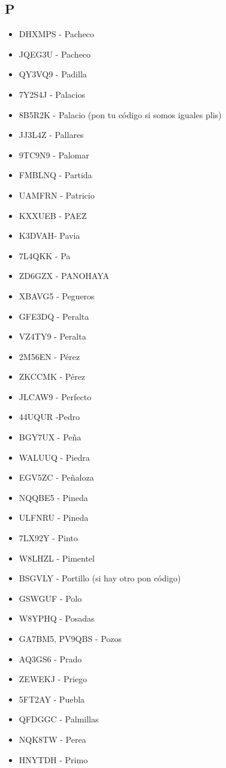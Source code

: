 \subsection*{P}
\begin{itemize}[leftmargin=*,nosep]
\item DHXMPS  -  Pacheco
\item JQEG3U - Pacheco
\item QY3VQ9  -  Padilla
\item 7Y2S4J  -  Palacios
\item 8B5R2K - Palacio (pon tu código si somos iguales plis)
\item JJ3L4Z - Pallares
\item 9TC9N9 - Palomar
\item FMBLNQ  -  Partida
\item UAMFRN - Patricio
\item KXXUEB - PAEZ
\item K3DVAH- Pavia
\item 7L4QKK - Pa
\item ZD6GZX - PANOHAYA
\item XBAVG5 - Pegueros
\item GFE3DQ - Peralta
\item VZ4TY9 - Peralta
\item 2M56EN  -  Pérez
\item ZKCCMK  -  Pérez
\item JLCAW9   - Perfecto
\item 44UQUR   -Pedro
\item BGY7UX - Peña
\item WALUUQ  -  Piedra
\item EGV5ZC - Peñaloza
\item NQQBE5 - Pineda
\item ULFNRU - Pineda
\item 7LX92Y - Pinto
\item W8LHZL  -  Pimentel
\item BSGVLY - Portillo (si hay otro pon código)
\item GSWGUF - Polo
\item W8YPHQ - Posadas
\item GA7BM5, PV9QBS  -  Pozos
\item AQ3GS6   -  Prado
\item ZEWEKJ  -  Priego
\item 5FT2AY  -  Puebla
\item QFDGGC - Palmillas
\item NQK8TW - Perea
\item HNYTDH - Primo
\end{itemize}

